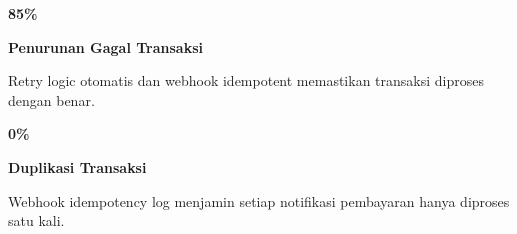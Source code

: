 \documentclass[a4paper]{article}
\begin{document}
\noindent
\begin{minipage}[t]{0.485\textwidth}
    \noindent\colorbox{BlueBg}{%
        \begin{minipage}[t][2.7cm][c]{\dimexpr\linewidth-2\fboxsep\relax}
            \centering
            {\fontsize{20}{24}\selectfont\bfseries\color{GreenPrimary} 85\%}\par\vspace{2pt}
            {\fontsize{9.5}{12}\selectfont\bfseries\color{BlueDark} Penurunan Gagal Transaksi}\par\vspace{2pt}
            {\fontsize{8.5}{11}\selectfont\color{TextDark}Retry logic otomatis dan webhook idempotent memastikan transaksi diproses dengan benar.}
        \end{minipage}}\par
    \vspace{6pt}
    \noindent\colorbox{BlueBg}{%
        \begin{minipage}[t][2.7cm][c]{\dimexpr\linewidth-2\fboxsep\relax}
            \centering
            {\fontsize{20}{24}\selectfont\bfseries\color{GreenPrimary} 0\%}\par\vspace{2pt}
            {\fontsize{9.5}{12}\selectfont\bfseries\color{BlueDark} Duplikasi Transaksi}\par\vspace{2pt}
            {\fontsize{8.5}{11}\selectfont\color{TextDark}Webhook idempotency log menjamin setiap notifikasi pembayaran hanya diproses satu kali.}
        \end{minipage}}%
\end{minipage}%
\hfill
\end{document}
